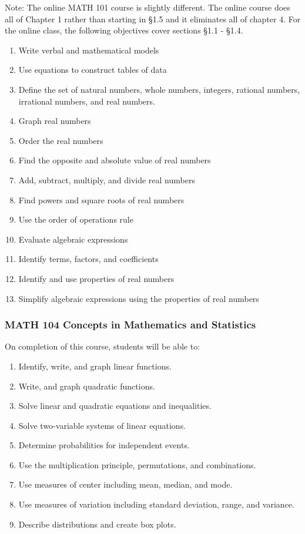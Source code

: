 \documentclass[11pt]{article}
\newenvironment{alphalist}{
  \begin{enumerate}[(1)]
    \addtolength{\itemsep}{-1.0\itemsep}}
  {\end{enumerate}}
\begin{document}
\noindent Note: The online MATH  101 course is slightly different. The online course does all of Chapter 1 rather than starting in \S 1.5 and
it eliminates all of chapter 4.  For the online class, the following objectives cover sections \S 1.1 - \S 1.4.
 
\begin{alphalist}
    \item Write verbal and mathematical models
    \item Use equations to construct tables of data
    \item Define the set of natural numbers, whole numbers, integers, rational numbers, irrational numbers, and real numbers.
    \item Graph real numbers
    \item Order the real numbers
    \item Find the opposite and absolute value of real numbers
    \item Add, subtract, multiply, and divide real numbers
    \item Find powers and square roots of real numbers
    \item Use the order of operations rule
    \item Evaluate algebraic expressions
    \item Identify terms, factors, and coefficients
    \item Identify and use properties of real numbers
    \item Simplify algebraic expressions using the properties of real numbers

\end{alphalist}



\subsubsection*{MATH 104  Concepts in Mathematics and Statistics}


On completion of this course, students will be able to:
\begin{alphalist}
    \item Identify, write, and graph linear functions.
    \item Write, and graph quadratic functions.
    \item Solve linear and quadratic equations and inequalities.
    \item Solve two-variable systems of linear equations.
    \item Determine probabilities for independent events.
    \item Use the multiplication principle, permutations, and combinations.
    \item Use measures of center including mean, median, and mode.
    \item Use measures of variation including standard deviation, range, and variance.
    \item Describe distributions and create box plots.
\end{alphalist}
\end{document}
